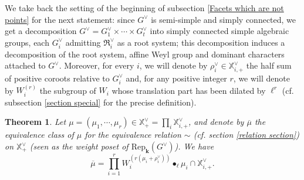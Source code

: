 \documentclass[11pt]{amsart}
\theoremstyle{plain}
\newtheorem{thm}{Theorem}[section]
\theoremstyle{remark}
\numberwithin{equation}{section}
\begin{document}
	We take back the setting of the beginning of subsection \ref{Facets which are not points} for the next statement: since $G^\vee$ is semi-simple and simply connected, we get a decomposition $G^\vee=G^\vee_1\times\cdots\times G_t^\vee$ into simply connected simple algebraic groups, each $G^\vee_i$ admitting $\mathfrak{R}^\vee_i$ as a root system; this decomposition induces a decomposition of the root system, affine Weyl group and dominant characters attached to $G^\vee$. Moreover, for every $i$, we will denote by $\rho_i^\vee\in\mathbb{X}^\vee_{i,+}$ the half sum of positive coroots relative to $G^\vee_i$ and, for any positive integer $r$, we will denote by $W_i^{(r)}$ the subgroup of $W_i$ whose translation part has been dilated by $\ell^r$ (cf. subsection \ref{section special} for the precise definition).
	\begin{thm}\label{thm Donkin}
	Let $\mu=(\mu_1,\cdots,\mu_r)\in \mathbb{X}^\vee_+=\prod_i \mathbb{X}^\vee_{i,+}$, and denote by $\overline{\mu}$ the equivalence class of $\mu$ for the equivalence relation $\sim$ (cf. section \ref{relation section}) on $\mathbb{X}^\vee_+$ (seen as the weight poset of $\mathrm{Rep}_\mathbf{k}(G^\vee)$). We have $$\overline{\mu}=\prod_{i=1}^r W_i^{(r(\mu_i+\rho^\vee_i))}\bullet_{\ell}\mu_i\cap\mathbb{X}^\vee_{i,+}.$$ 
	\end{thm}
\end{document}
